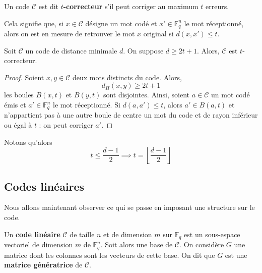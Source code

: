   \begin{definition}
    Un code $\mathcal{C}$ est dit \textbf{$t$-correcteur} s'il peut corriger au maximum $t$ erreurs.
  \end{definition}

  \begin{remark}
    Cela signifie que, si $x \in \mathcal{C}$ désigne un mot codé et $x' \in \mathbb{F}_q^n$ le mot réceptionné, alors on est en mesure de retrouver le mot $x$ original si $d(x,x') \leq t$.
  \end{remark}

  \begin{proposition}
    Soit $\mathcal{C}$ un code de distance minimale $d$. On suppose $d \geq 2t + 1$. Alors, $\mathcal{C}$ est $t$-correcteur.
  \end{proposition}

  \begin{proof}
    Soient $x, y \in \mathcal{C}$ deux mots distincts du code. Alors,
    \[ d_H(x,y) \geq 2t+1 \]
    les boules $B(x,t)$ et $B(y,t)$ sont disjointes.
    Ainsi, soient $a \in \mathcal{C}$ un mot codé émis et $a' \in \mathbb{F}_q^n$ le mot réceptionné. Si $d(a,a') \leq t$, alors $a' \in B(a,t)$ et n'appartient pas à une autre boule de centre un mot du code et de rayon inférieur ou égal à $t$ : on peut corriger $a'$.
  \end{proof}

  \begin{remark}
    \label{codes-correcteurs-1}
    Notons qu'alors
    \[ t \leq \frac{d-1}{2} \implies t = \left\lfloor \frac{d-1}{2} \right\rfloor \]
  \end{remark}

  \subsection{Codes linéaires}

  Nous allons maintenant observer ce qui se passe en imposant une structure sur le code.

  \begin{definition}
    Un \textbf{code linéaire} $\mathcal{C}$ de taille $n$ et de dimension $m$ sur $\mathbb{F}_q$ est un sous-espace vectoriel de dimension $m$ de $\mathbb{F}_q^n$.
    \newpar
    Soit alors une base de $\mathcal{C}$. On considère $G$ une matrice dont les colonnes sont les vecteurs de cette base. On dit que $G$ est une \textbf{matrice génératrice} de $\mathcal{C}$.
  \end{definition}

